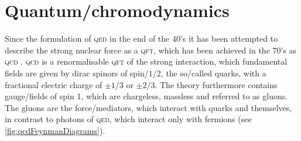 \documentclass[../../index.tex]{subfiles}
\begin{document}
\section{Quantum\-/chromodynamics}
\label{sec:quantumchromodynamics}
Since the formulation of \textsc{qed} in the end of the 40's it has been
attempted to describe the strong nuclear force as a \textsc{qft}, which has been
achieved in the 70's as \textsc{qcd}
\cite{GellMann1972,Fritzsch1973,Gross1973,Politzer1973,Weinberg1973}.
\textsc{qcd} is a renormalisable \textsc{qft} of the strong interaction, which
fundamental fields are given by dirac spinors of spin\-/$1/2$, the so\-/called
quarks, with a fractional electric charge of $\pm 1/3$ or $\pm 2/3$. The theory
furthermore contains gauge\-/fields of spin 1, which are chargeless, massless
and referred to as gluons. The gluons are the force\-/mediators, which interact
with quarks and themselves, in contrast to photons of \textsc{qed}, which
interact only with fermions (see \cref{fig:qcdFeynmanDiagrams}).
\end{document}
